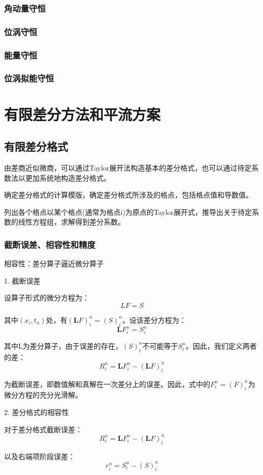 \documentclass{article}
\begin{document}
\subsubsection{角动量守恒}
\subsubsection{位涡守恒}
\subsubsection{能量守恒}
\subsubsection{位涡拟能守恒}

\section{有限差分方法和平流方案}
\subsection{有限差分格式}
由差商近似微商，可以通过Taylor展开法构造基本的差分格式，也可以通过待定系数法以更加系统地构造差分格式。

确定差分格式的计算模版，确定差分格式所涉及的格点，包括格点值和导数值。

列出各个格点以某个格点(通常为格点i)为原点的Taylor展开式，推导出关于待定系数的线性方程组，求解得到差分系数。
\subsubsection{截断误差、相容性和精度}
相容性：差分算子逼近微分算子

1. 截断误差

设算子形式的微分方程为：
$$LF = S$$

其中$(x_i, t_n)$处，有$(\mathbf{L}F)_i^n = (S)_i^n$。设该差分方程为：
$$\mathbf{L}F_i^n = S_i^n$$

其中L为差分算子，由于误差的存在，$(S)_i^n$不可能等于$S_i^n$。因此，我们定义两者的差：
$$R_i^n = \mathbf{L}F_i^n-(\mathbf{L}F)_i^n$$

为截断误差，即数值解和真解在一次差分上的误差。因此，式中的$F_i^n=(F)_i^n$为微分方程的充分光滑解。

2. 差分格式的相容性

对于差分格式截断误差：$$R_i^n = \mathbf{L}F_i^n-(\mathbf{L}F)_i^n$$

以及右端项阶段误差：$$r_i^n =  S_i^n-(S)_i^n$$
\end{document}
